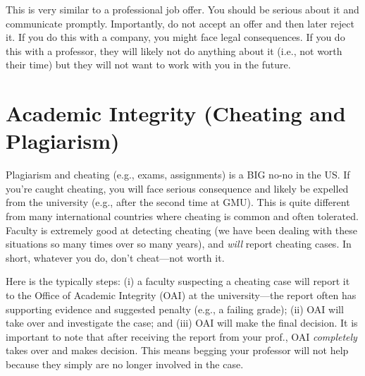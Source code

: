 \documentclass[oneside,11pt]{book}
\begin{document}
This is very similar to a professional job offer.  You should be serious about it and communicate promptly. Importantly, do not accept an offer and then later reject it.  If you do this with a company, you might face legal consequences.  If you do this with a professor, they will likely not do anything about it (i.e., not worth their time) but they will not want to work with you in the future.




\section{Academic Integrity (Cheating and Plagiarism)} 

Plagiarism and cheating (e.g., exams, assignments) is a BIG no-no in the US.  If you're caught cheating, you will face serious consequence and likely be expelled from the university (e.g., after the second time at GMU).   This is quite different from many international countries where cheating is common and often tolerated.  Faculty is extremely good at detecting cheating (we have been dealing with these situations so many times over so many years), and \emph{will} report cheating cases.  In short, whatever you do, don't cheat---not worth it.

Here is the typically steps: (i) a faculty suspecting a cheating case will report it to the Office of Academic Integrity (OAI) at the university---the report often has supporting evidence and suggested penalty (e.g., a failing grade);  (ii)  OAI will take over and investigate the case; and (iii) OAI will make the final decision.  It is important to note that after receiving the report from your prof., OAI \emph{completely} takes over and makes decision.  This means begging your professor will not help because they simply are no longer involved in the case.
\end{document}
